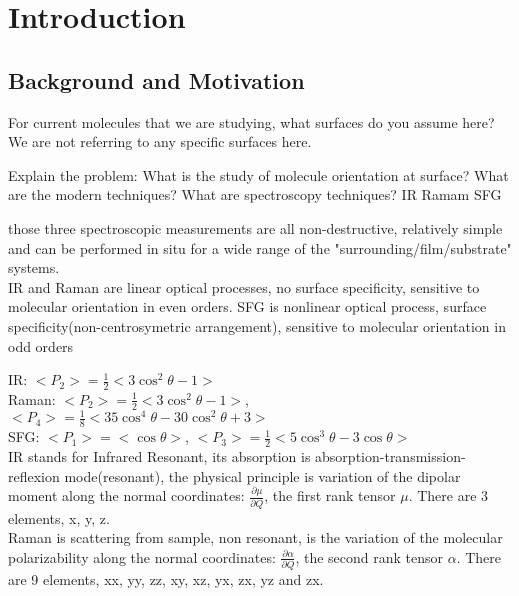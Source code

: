 \section{Introduction}
\subsection{Background and Motivation}


For current molecules that we are studying, what surfaces do you assume here?
We are not referring to any specific surfaces here.


	Explain the problem: 
	What is the study of molecule orientation at surface?
	What are the modern techniques? 
	What are spectroscopy techniques? 
	IR
	Ramam
	SFG
	
	
	those three spectroscopic measurements are all non-destructive, relatively simple and can be performed in situ for a wide range of the "surrounding/film/substrate" systems.\cite{01}\cite{02} \\
	
	IR and Raman are linear optical processes, no surface specificity, sensitive to molecular orientation in even orders. SFG is nonlinear optical process, surface specificity(non-centrosymetric arrangement), sensitive to molecular orientation in odd orders
		
	IR: $\big<P_2\big> = \frac{1}{2} \big<3\cos^2\theta -1 \big> $ \\
	
	Raman: $\big<P_2\big> = \frac{1}{2} \big<3\cos^2\theta -1 \big> $, $\big<P_4\big> = \frac{1}{8} \big< 35\cos^4\theta -30\cos^2\theta + 3 \big> $ \\
	
	SFG: $\big<P_1\big> = \big< \cos\theta \big> $,
	$\big<P_3\big> = \frac{1}{2} \big<5\cos^3\theta -3\cos\theta \big> $ \\


IR stands for Infrared Resonant, its absorption is absorption-transmission-reflexion mode(resonant), the physical principle is variation of the dipolar moment along the normal coordinates: $\frac{\partial\mu}{\partial Q} $, the first rank tensor $ \mu $. There are 3 elements, x, y, z.\\

Raman is scattering from sample, non resonant, is the variation of the molecular polarizability along the normal coordinates: $\frac{\partial\alpha}{\partial Q} $, the second rank tensor $\alpha$. There are 9 elements, xx, yy, zz, xy, xz, yx, zx, yz and zx.\\

